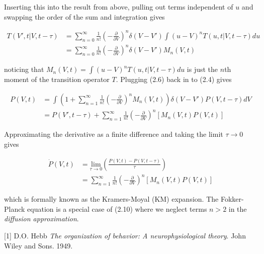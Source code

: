 \documentclass{ucetd}
\begin{document}
\begin{appendices}
Inserting this into the result from above, pulling out terms independent of $u$ and swapping the order of the sum and integration gives

\begin{align}
T(V', t | V, t-\tau) &= \sum_{n=0}^{\infty} \frac{1}{n!}\left(-\frac{\partial}{\partial V}\right)^{n}\delta(V-V')\int(u-V)^{n}T(u, t | V, t-\tau)du\\
&= \sum_{n=0}^{\infty} \frac{1}{n!}\left(-\frac{\partial}{\partial V}\right)^{n}\delta(V-V')M_{n}(V,t)
\end{align} 

noticing that $M_{n}(V,t) = \int(u-V)^{n}T(u, t | V, t-\tau)du$ is just the $n$th moment of the transition operator $T$. Plugging (2.6) back in to (2.4) gives 

\begin{align}
P(V, t) &= \int \left(1 + \sum_{n=1}^{\infty} \frac{1}{n!}\left(-\frac{\partial}{\partial V}\right)^{n} M_{n}(V,t)\right)\delta(V-V')P(V, t-\tau)dV\\
&= P(V', t-\tau) + \sum_{n=1}^{\infty} \frac{1}{n!}\left(-\frac{\partial}{\partial V}\right)^{n} \left[M_{n}(V,t)P(V,t)\right]
\end{align} 

Approximating the derivative as a finite difference and taking the limit $\tau\rightarrow 0$ gives

\begin{align}
\dot{P}(V,t)  &= \underset{\tau\rightarrow 0}{\mathrm{lim}}\left(\frac{P(V, t)-P(V, t-\tau)}{\tau}\right)\\
&= \sum_{n=1}^{\infty} \frac{1}{n!}\left(-\frac{\partial}{\partial V}\right)^{n} \left[M_{n}(V,t)P(V,t)\right]
\end{align} 

which is formally known as the Kramers-Moyal (KM) expansion. The Fokker-Planck equation is a special case of (2.10) where we neglect terms $n>2$ in the \emph{diffusion approximation}.
\end{appendices}

\makebibliography

[1] D.O. Hebb \textit{The organization of behavior: A neurophysiological theory}. John Wiley and Sons. 1949.

%
%
\end{document}
